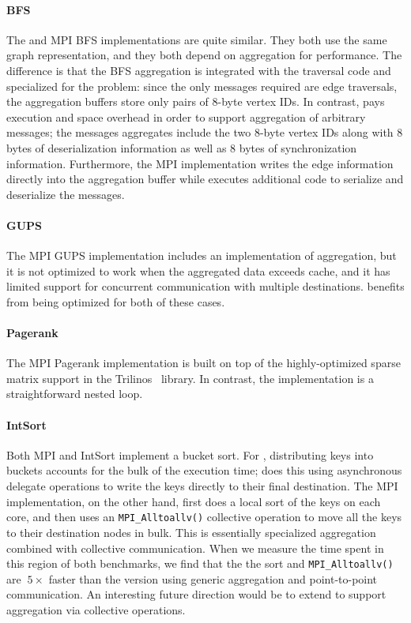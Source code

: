 \paragraph{BFS}
The \Grappa and MPI BFS implementations are quite similar. They both
use the same graph representation, and they both depend on aggregation
for performance. The difference is that the BFS aggregation is
integrated with the traversal code and specialized for the problem:
since the only messages required are edge traversals, the aggregation
buffers store only pairs of 8-byte vertex IDs.  In contrast, \Grappa
pays execution and space overhead in order to support aggregation of
arbitrary messages; the messages \Grappa aggregates include the two
8-byte vertex IDs along with 8 bytes of deserialization information as
well as 8 bytes of synchronization information. Furthermore, the MPI
implementation writes the edge information directly into the
aggregation buffer while \Grappa executes additional code to serialize
and deserialize the messages.

\paragraph{GUPS}
The MPI GUPS implementation includes an implementation of aggregation,
but it is not optimized to work when the aggregated data exceeds
cache, and it has limited support for concurrent communication with
multiple destinations. \Grappa benefits from being optimized for both
of these cases.

\paragraph{Pagerank}
The MPI Pagerank implementation is built on top of the
highly-optimized sparse matrix support in the Trilinos~\cite{trilinos}
library. In contrast, the \Grappa implementation is a straightforward nested
loop.

\paragraph{IntSort}
Both MPI and \Grappa IntSort implement a bucket sort. For \Grappa,
distributing keys into buckets accounts for the bulk of the execution
time; \Grappa does this using asynchronous delegate operations to
write the keys directly to their final destination. The MPI
implementation, on the other hand, first does a local sort of the keys
on each core, and then uses an \texttt{MPI\_Alltoallv()} collective
operation to move all the keys to their destination nodes in
bulk. This is essentially specialized aggregation combined with
collective communication. When we measure the time spent in this
region of both benchmarks, we find that the the sort and
\texttt{MPI\_Alltoallv()} are $~5\times$ faster than the \Grappa
version using generic aggregation and point-to-point communication. An
interesting future direction would be to extend \Grappa to support
aggregation via collective operations.


